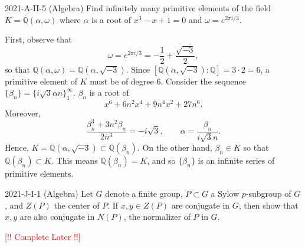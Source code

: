 \documentclass{article}
\begin{document}
\begin{prb}{2021-A-II-5 (Algebra)}
	Find infinitely many primitive elements of the field $K = \mathbb{Q}(\alpha, \omega)$ where $\alpha$ is a root of $x^{3} - x + 1=0$ and $\omega = e^{2\pi i/3}$. 
\end{prb}
\begin{solutions}
	First, observe that 
		\begin{equation}
			\omega = e^{2\pi i/3} = -\frac{1}{2} + \frac{\sqrt{-3}}{2}, 
		\end{equation}
	so that $\mathbb{Q}(\alpha, \omega) = \mathbb{Q}(\alpha, \sqrt{-3})$. Since $[\mathbb{Q}(\alpha, \sqrt{-3}):\mathbb{Q}] = 3 \cdot 2 = 6$, a primitive element of $K$ must be of degree 6. Consider the sequence $\{\beta_{n}\}= \{i\sqrt{3}\alpha n\}_{1}^{\infty}$. $\beta_{n}$ is a root of 
		\begin{equation}
			x^{6} + 6n^{2}x^{4} + 9n^{4}x^{2} + 27n^{6}. 
		\end{equation}
	Moreover, 
		\begin{equation}
			\frac{\beta_{n}^{3} + 3n^{2}\beta_{n}}{2n^{3}} =-i\sqrt{3}, \qquad \alpha = \frac{\beta_{n}}{i\sqrt{3}n}. 
		\end{equation}
	Hence, $K = \mathbb{Q}(\alpha,\sqrt{-3}) \subset \mathbb{Q}(\beta_{n})$. On the other hand, $\beta_{n} \in K$ so that $\mathbb{Q}(\beta_{n}) \subset K$. This means $\mathbb{Q}(\beta_{n}) = K$, and so $\{\beta_{n}\}$ is an infinite series of primitive elements. 
\end{solutions}
\begin{prb}{2021-J-I-1 (Algebra)}
	Let $G$ denote a finite group, $P \subset G$ a Sylow $p$-subgroup of $G$, and $Z(P)$ the center of $P$. If $x, y \in Z(P)$ are conjugate in $G$, then show that $x, y$ are also conjugate in $N(P)$, the normalizer of $P$ in $G$. 
\end{prb}
\begin{solutions}
	\textcolor{red}{[!! Complete Later !!]}
\end{solutions}
\end{document}
